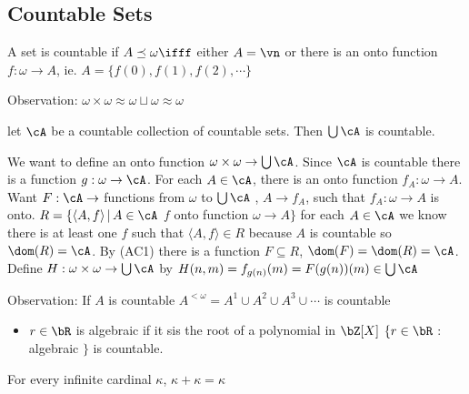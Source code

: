 
\subsection{Countable Sets}

\begin{definition}
    A set is countable if $A \preceq \omega \ifff$ either $A = \vn$ or there is an onto function $f: \omega \to A$, ie. $A = \{f(0), f(1), f(2), \cdots\}$ 
\end{definition}

\noindent
Observation: $\omega \times \omega \approx \omega \sqcup \omega \approx \omega$ 

\begin{theorem}
    let $\cA$ be a countable collection of countable sets. Then $\bigcup \cA$ is countable. 
\end{theorem}

\begin{pf}
    We want to define an onto function $\omega \times \omega \to \bigcup \cA$. Since $\cA$ is countable there is a function $g: \omega \to \cA$. For each $A \in \cA$, there is an onto function $f_A : \omega \to A$. Want $F: \cA \to $ functions from $\omega$ to $\bigcup \cA$ , $A \to f_A$, such that $f_A: \omega \to A$ is onto. $R = \{ \langle A, f \rangle \, | \, A \in \cA$ $f$ onto function $\omega \to A\}$ for each $A \in \cA$ we know there is at least one $f$ such that $\langle A, f \rangle \in R$ because $A$ is countable so $\dom(R) = \cA$. By (AC1) there is a function $F \subseteq R$, $\dom(F) = \dom(R) = \cA$. Define $H: \omega\times \omega \to \bigcup \cA$ by $H(n,m) =  f_{g(n)}(m) = F(g(n))(m) \in \bigcup \cA$ 
\end{pf}

\noindent
Observation: If $A$ is countable $A^{< \omega} = A^1 \cup A^2 \cup A^3 \cup \cdots$ is countable 

\begin{itemize}
    \item $r \in \bR$ is algebraic if it sis the root of a polynomial in $\bZ[X]$ $\{r \in \bR$ : algebraic $\}$ is countable. 
\end{itemize}

\begin{theorem}
    For every infinite cardinal $\kappa$, $\kappa + \kappa = \kappa$
\end{theorem}

